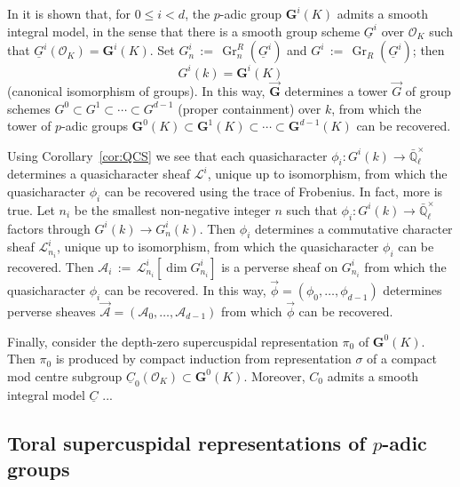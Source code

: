 \documentclass[10pt]{amsart}
\theoremstyle{plain}
\theoremstyle{definition}
\newcommand{\EE}{\mathbb{\bar Q}_\ell}
\newcommand{\OK}{\mathcal{O}_K}
\newcommand{\Fq}{k}
\newcommand{\EEx}{\EE^\times}
\newcommand{\G}{\textbf{G}}
\DeclareMathOperator{\Gr}{Gr}
\newcommand{\ceq}{{\, :=\, }}
\newcommand{\cs}[1]{{\mathcal{#1}}}
\begin{document}
In \cite{yu:03a} it is shown that, for $0 \leq i < d$, the $p$-adic group $\G^i(K)$ admits a smooth integral model, in the sense that there is  a smooth group scheme $\underline{G}^i$ over $\OK$ such that $\underline{G}^i(\OK) = \G^i(K)$.
Set $G^i_n \ceq \Gr^R_n(\underline{G}^i)$ and $G^i \ceq \Gr_R(\underline{G}^i)$; 
then \[G^i(\Fq) = \G^i(K)\] (canonical isomorphism of groups).
In this way, $\vec{\G}$ determines a tower $\vec{G}$ of group schemes $G^0 \subset G^1 \subset \cdots  \subset G^{d-1}$ (proper containment) over $\Fq$, from which the tower of $p$-adic groups
$\G^0(K) \subset \G^1(K) \subset \cdots  \subset \G^{d-1}(K)$ can be recovered.

Using Corollary~\ref{cor:QCS}  we see that each quasicharacter $\phi_i : G^i(\Fq) \to \EEx$ determines a quasicharacter sheaf $\cs{L}^i$, unique up to isomorphism, from which the quasicharacter $\phi_i$ can be recovered using the trace of Frobenius. 
In fact, more is true. Let $n_i$ be the smallest non-negative integer $n$ such that $\phi_i : G^i(\Fq) \to \EEx$ factors through $G^i(\Fq) \to G^i_n(\Fq)$.
Then $\phi_i$ determines a commutative character sheaf $\cs{L}_{n_i}^i$, unique up to isomorphism, from which the quasicharacter $\phi_i$ can be recovered.
Then $\cs{A}_i\ceq \cs{L}_{n_i}^i[\dim G_{n_i}^i]$ is a perverse sheaf on $G_{n_i}^i$ from which the quasicharacter $\phi_i$ can be recovered.
In this way,  $\vec{\phi} = (\phi_0, \ldots , \phi_{d-1})$ determines perverse sheaves $\vec{\cs{A}} = (\cs{A}_0, \ldots , \cs{A}_{d-1})$ from which $\vec{\phi}$ can be recovered. 

Finally, consider the depth-zero supercuspidal representation $\pi_0$ of $\G^0(K)$.
Then $\pi_0$ is produced by compact induction from representation $\sigma$ of a compact mod centre subgroup $\underline{C}_0(\OK) \subset \G^0(K)$. Moreover, $C_0$ admits a smooth integral model $\underline{C}$ ...

\subsection{Toral supercuspidal representations of $p$-adic groups}




\end{document}
